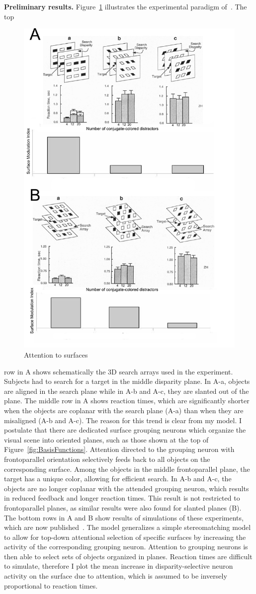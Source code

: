 \documentclass[11pt]{article}
\begin{document}
\textbf{Preliminary results.} Figure~\ref{fig:Nakayama} illustrates the experimental paradigm of~\citet{He_Nakayama95}. The top
\begin{figure}
  \vspace{-10pt}
  \centering 
  \includegraphics[width=.4\textwidth]{figs/nakayama_v2}
  \vspace{-30pt}
  \caption{Attention to surfaces} 
  \vspace{-15pt}
  \label{fig:Nakayama}
\end{figure}
row in A shows schematically the 3D search arrays used in the experiment. Subjects had to search for a target in the middle disparity plane. In A-a, objects are aligned in the search plane while in A-b and A-c, they are slanted out of the plane. The middle row in A shows reaction times, which are significantly shorter when the objects are coplanar with the search plane (A-a) than when they are misaligned (A-b and A-c). The reason for this trend is clear from my model. I postulate that there are dedicated surface grouping neurons which organize the visual scene into oriented planes, such as those shown at the top of Figure~\ref{fig:BasisFunctions}. Attention directed to the grouping neuron with frontoparallel orientation selectively feeds back to all objects on the corresponding surface. Among the objects in the middle frontoparallel plane, the target has a unique color, allowing for efficient search. In A-b and A-c, the objects are no longer coplanar with the attended grouping neuron, which results in reduced feedback and longer reaction times. This result is not restricted to frontoparallel planes, as similar results were also found for slanted planes (B). The bottom rows in A and B show results of simulations of these experiments, which are now published~\citep{Hu_etal15a}. The model generalizes a simple stereomatching model~\citep{Marshall_etal96} to allow for top-down attentional selection of specific surfaces by increasing the activity of the corresponding grouping neuron. Attention to grouping neurons is then able to select sets of objects organized in planes. Reaction times are difficult to simulate, therefore I plot the mean increase in disparity-selective neuron activity on the surface due to attention, which is assumed to be inversely proportional to reaction times.
\end{document}
